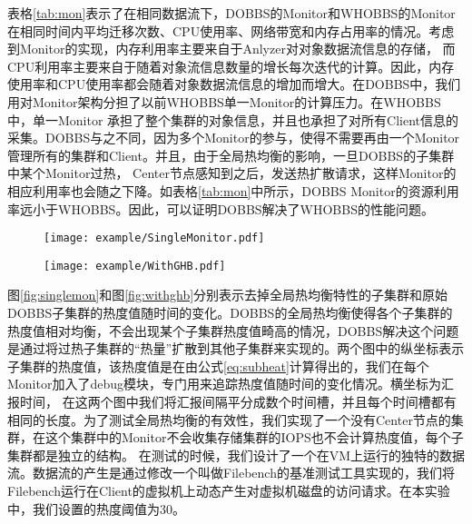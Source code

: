 表格\ref{tab:mon}表示了在相同数据流下，DOBBS的Monitor和WHOBBS的Monitor在相同时间内平均迁移次数、CPU使用率、网络带宽和内存占用率的情况。考虑到Monitor的实现，内存利用率主要来自于Anlyzer对对象数据流信息的存储，
而CPU利用率主要来自于随着对象流信息数量的增长每次迭代的计算。因此，内存使用率和CPU使用率都会随着对象数据流信息的增加而增大。在DOBBS中，我们用对Monitor架构分担了以前WHOBBS单一Monitor的计算压力。在WHOBBS中，单一Monitor
承担了整个集群的对象信息，并且也承担了对所有Client信息的采集。DOBBS与之不同，因为多个Monitor的参与，使得不需要再由一个Monitor管理所有的集群和Client。并且，由于全局热均衡的影响，一旦DOBBS的子集群中某个Monitor过热，
Center节点感知到之后，发送热扩散请求，这样Monitor的相应利用率也会随之下降。如表格\ref{tab:mon}中所示，DOBBS Monitor的资源利用率远小于WHOBBS。因此，可以证明DOBBS解决了WHOBBS的性能问题。

\begin{figure}[!htp]
    \centering
    \texttt{[image: example/SingleMonitor.pdf]}
\end{figure}

\begin{figure}[!htp]
    \centering
    \texttt{[image: example/WithGHB.pdf]}
\end{figure}



图\ref{fig:singlemon}和图\ref{fig:withghb}分别表示去掉全局热均衡特性的子集群和原始DOBBS子集群的热度值随时间的变化。DOBBS的全局热均衡使得各个子集群的热度值相对均衡，不会出现某个子集群热度值畸高的情况，DOBBS解决这个问题
是通过将过热子集群的“热量”扩散到其他子集群来实现的。两个图中的纵坐标表示子集群的热度值，该热度值是在由公式\ref{eq:subheat}计算得出的，我们在每个Monitor加入了debug模块，专门用来追踪热度值随时间的变化情况。横坐标为汇报时间，
在这两个图中我们将汇报间隔平分成数个时间槽，并且每个时间槽都有相同的长度。为了测试全局热均衡的有效性，我们实现了一个没有Center节点的集群，在这个集群中的Monitor不会收集存储集群的IOPS也不会计算热度值，每个子集群都是独立的结构。
在测试的时候，我们设计了一个在VM上运行的独特的数据流。数据流的产生是通过修改一个叫做Filebench的基准测试工具实现的，我们将Filebench运行在Client的虚拟机上动态产生对虚拟机磁盘的访问请求。在本实验中，我们设置的热度阈值为30。

